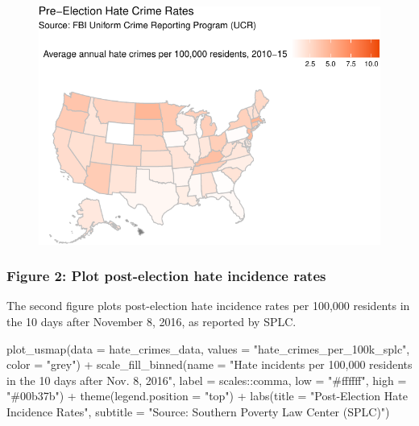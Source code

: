 \documentclass[
  letterpaper,
  DIV=11,
  numbers=noendperiod]{scrartcl}
\newenvironment{Shaded}{\begin{snugshade}}{\end{snugshade}}
\newcommand{\AttributeTok}[1]{\textcolor[rgb]{0.40,0.45,0.13}{#1}}
\newcommand{\FunctionTok}[1]{\textcolor[rgb]{0.28,0.35,0.67}{#1}}
\newcommand{\NormalTok}[1]{\textcolor[rgb]{0.00,0.23,0.31}{#1}}
\newcommand{\SpecialCharTok}[1]{\textcolor[rgb]{0.37,0.37,0.37}{#1}}
\newcommand{\StringTok}[1]{\textcolor[rgb]{0.13,0.47,0.30}{#1}}
\begin{document}
\begin{figure}[H]

{\centering \includegraphics{hate_crimes_reproduction_files/figure-pdf/pre-election-hate-crimes-1.pdf}

}

\end{figure}

\hypertarget{figure-2-plot-post-election-hate-incidence-rates}{%
\subsubsection{Figure 2: Plot post-election hate incidence
rates}\label{figure-2-plot-post-election-hate-incidence-rates}}

The second figure plots post-election hate incidence rates per 100,000
residents in the 10 days after November 8, 2016, as reported by SPLC.

\begin{Shaded}
\begin{Highlighting}[]
\FunctionTok{plot\_usmap}\NormalTok{(}\AttributeTok{data =}\NormalTok{ hate\_crimes\_data, }\AttributeTok{values =} \StringTok{"hate\_crimes\_per\_100k\_splc"}\NormalTok{, }\AttributeTok{color =} \StringTok{"grey"}\NormalTok{) }\SpecialCharTok{+} 
  \FunctionTok{scale\_fill\_binned}\NormalTok{(}\AttributeTok{name =} \StringTok{"Hate incidents per 100,000 residents in the 10 days after Nov. 8, 2016"}\NormalTok{, }\AttributeTok{label =}\NormalTok{ scales}\SpecialCharTok{::}\NormalTok{comma, }\AttributeTok{low =} \StringTok{"\#ffffff"}\NormalTok{, }\AttributeTok{high =} \StringTok{"\#00b37b"}\NormalTok{) }\SpecialCharTok{+} 
  \FunctionTok{theme}\NormalTok{(}\AttributeTok{legend.position =} \StringTok{"top"}\NormalTok{) }\SpecialCharTok{+}
  \FunctionTok{labs}\NormalTok{(}\AttributeTok{title =} \StringTok{"Post{-}Election Hate Incidence Rates"}\NormalTok{,}
       \AttributeTok{subtitle =} \StringTok{"Source: Southern Poverty Law Center (SPLC)"}\NormalTok{)}
\end{Highlighting}
\end{Shaded}
\end{document}
